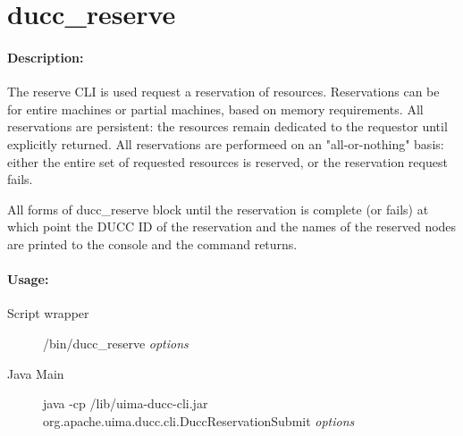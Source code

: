 % 
% 
% 
% 
\ifpdf
\else
{}
\fi
    \section{ducc\_reserve}

    \paragraph{Description:}
    The reserve CLI is used request a reservation of resources. Reservations can be for entire 
    machines or partial machines, based on memory requirements. All reservations are persistent: 
    the resources remain dedicated to the requestor until explicitly returned. All reservations are 
    performeed on an "all-or-nothing" basis: either the entire set of requested resources is reserved, 
    or the reservation request fails. 

    All forms of ducc\_reserve block until the reservation is complete (or fails) at which point the DUCC
    ID of the reservation and the names of the reserved nodes are printed to the console and the
    command returns.

    \paragraph{Usage:}
        \begin{description}
        \item[Script wrapper] \ducchome/bin/ducc\_reserve {\em options}
        \item[Java Main]      java -cp \ducchome/lib/uima-ducc-cli.jar org.apache.uima.ducc.cli.DuccReservationSubmit {\em options}
        \end{description}

